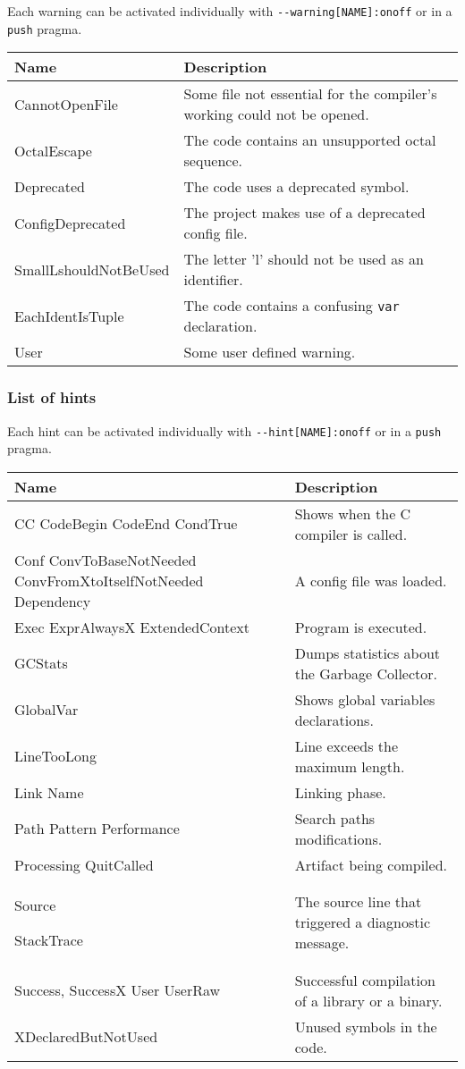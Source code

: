 Each warning can be activated individually with
\texttt{-\/-warning{[}NAME{]}:on\textbar{}off} or in a \texttt{push}
pragma.

\begin{longtable}[]{@{}ll@{}}
\toprule
Name & Description\tabularnewline
\midrule
\endhead
CannotOpenFile & Some file not essential for the compiler's working
could not be opened.\tabularnewline
OctalEscape & The code contains an unsupported octal
sequence.\tabularnewline
Deprecated & The code uses a deprecated symbol.\tabularnewline
ConfigDeprecated & The project makes use of a deprecated config
file.\tabularnewline
SmallLshouldNotBeUsed & The letter 'l' should not be used as an
identifier.\tabularnewline
EachIdentIsTuple & The code contains a confusing \texttt{var}
declaration.\tabularnewline
User & Some user defined warning.\tabularnewline
\bottomrule
\end{longtable}

\hypertarget{list-of-hints}{%
\subsubsection{List of hints}\label{list-of-hints}}

Each hint can be activated individually with
\texttt{-\/-hint{[}NAME{]}:on\textbar{}off} or in a \texttt{push}
pragma.

\begin{longtable}[]{@{}ll@{}}
\toprule
Name & Description\tabularnewline
\midrule
\endhead
CC CodeBegin CodeEnd CondTrue & Shows when the C compiler is
called.\tabularnewline
Conf ConvToBaseNotNeeded ConvFromXtoItselfNotNeeded Dependency & A
config file was loaded.\tabularnewline
Exec ExprAlwaysX ExtendedContext & Program is executed.\tabularnewline
GCStats & Dumps statistics about the Garbage Collector.\tabularnewline
GlobalVar & Shows global variables declarations.\tabularnewline
LineTooLong & Line exceeds the maximum length.\tabularnewline
Link Name & Linking phase.\tabularnewline
Path Pattern Performance & Search paths modifications.\tabularnewline
Processing QuitCalled & Artifact being compiled.\tabularnewline
\begin{minipage}[t]{0.47\columnwidth}\raggedright
Source

StackTrace\strut
\end{minipage} & \begin{minipage}[t]{0.47\columnwidth}\raggedright
The source line that triggered a diagnostic message.\strut
\end{minipage}\tabularnewline
Success, SuccessX User UserRaw & Successful compilation of a library or
a binary.\tabularnewline
XDeclaredButNotUsed & Unused symbols in the code.\tabularnewline
\bottomrule
\end{longtable}

